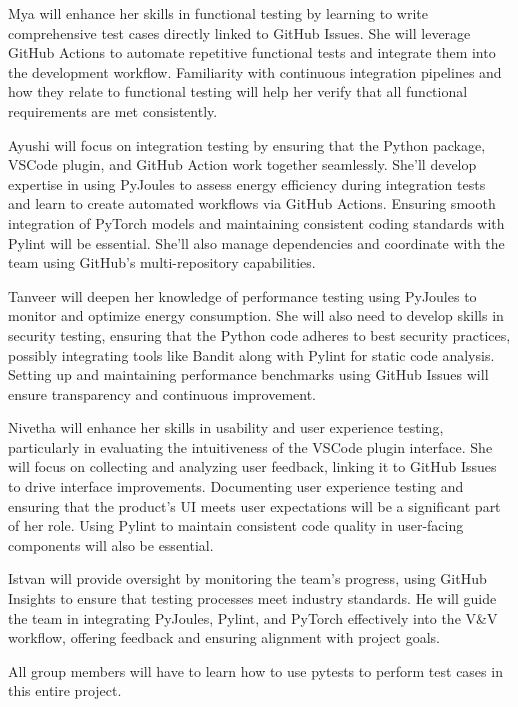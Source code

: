 \documentclass[12pt, titlepage]{article}
\begin{document}
\begin{enumerate}[label={\bf \textcolor{Maroon}{test-SRT-\arabic*}}, wide=0pt, font=\itshape]
\begin{appendices}
\begin{itemize}
  Mya will enhance her skills in functional testing by learning to write comprehensive 
  test cases directly linked to GitHub Issues. She will leverage GitHub Actions to 
  automate repetitive functional tests and integrate them into the development workflow. 
  Familiarity with continuous integration pipelines and how they relate to functional 
  testing will help her verify that all functional requirements are met consistently.

  Ayushi will focus on integration testing by ensuring that the Python package, VSCode 
  plugin, and GitHub Action work together seamlessly. She’ll develop expertise in using 
  PyJoules to assess energy efficiency during integration tests and learn to create 
  automated workflows via GitHub Actions. Ensuring smooth integration of PyTorch models 
  and maintaining consistent coding standards with Pylint will be essential. She’ll 
  also manage dependencies and coordinate with the team using GitHub’s multi-repository 
  capabilities.

  Tanveer will deepen her knowledge of performance testing using PyJoules to monitor 
  and optimize energy consumption. She will also need to develop skills in security 
  testing, ensuring that the Python code adheres to best security practices, possibly 
  integrating tools like Bandit along with Pylint for static code analysis. Setting 
  up and maintaining performance benchmarks using GitHub Issues will ensure transparency 
  and continuous improvement.

  Nivetha will enhance her skills in usability and user experience testing, particularly 
  in evaluating the intuitiveness of the VSCode plugin interface. She will focus on 
  collecting and analyzing user feedback, linking it to GitHub Issues to drive interface 
  improvements. Documenting user experience testing and ensuring that the product’s UI 
  meets user expectations will be a significant part of her role. Using Pylint to maintain 
  consistent code quality in user-facing components will also be essential.

  Istvan will provide oversight by monitoring the team’s progress, using GitHub Insights 
  to ensure that testing processes meet industry standards. He will guide the team in 
  integrating PyJoules, Pylint, and PyTorch effectively into the V\&V workflow, offering 
  feedback and ensuring alignment with project goals.

  All group members will have to learn how to use pytests to perform test cases in this
  entire project.


\end{itemize}
\end{appendices}
\end{enumerate}
\end{document}
